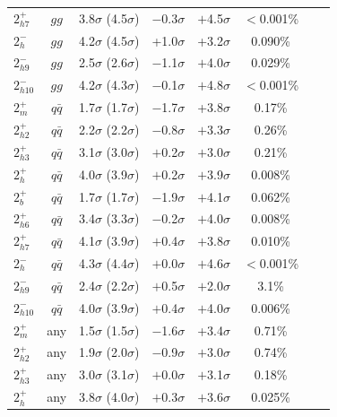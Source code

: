 \begin{table}
{\begin{tabular}{lccccccc}
$2^+_{h7}$ & $gg$         & 3.8$\sigma$ (4.5$\sigma$) & $-$0.3$\sigma$ & $+$4.5$\sigma$ & $<$0.001\%  \\
 $2^-_{h}$     & $gg$       &  4.2$\sigma$ (4.5$\sigma$)  & +1.0$\sigma$    & +3.2$\sigma$  &  0.090\%  \\
$2^-_{h9}$ & $gg$          & 2.5$\sigma$ (2.6$\sigma$) & $-$1.1$\sigma$ & $+$4.0$\sigma$ & 0.029\%  \\
$2^-_{h10}$ & $gg$         & 4.2$\sigma$ (4.3$\sigma$) & $-$0.1$\sigma$ & $+$4.8$\sigma$ & $<$0.001\%  \\
\hline
$2_{m}^+$     & $q\bar{q}$       &  1.7$\sigma$ (1.7$\sigma$)  & $-$1.7$\sigma$  & +3.8$\sigma$  &  0.17\% \\
$2^+_{h2}$ & $q\bar{q}$ & 2.2$\sigma$ (2.2$\sigma$) & $-$0.8$\sigma$ & $+$3.3$\sigma$ & 0.26\% \\
$2^+_{h3}$ & $q\bar{q}$ & 3.1$\sigma$ (3.0$\sigma$) & $+$0.2$\sigma$ & $+$3.0$\sigma$ & 0.21\% \\
$2^+_{h}$  & $q\bar{q}$ & 4.0$\sigma$ (3.9$\sigma$) & $+$0.2$\sigma$ & $+$3.9$\sigma$ & 0.008\%  \\
$2^+_{b}$  & $q\bar{q}$ & 1.7$\sigma$ (1.7$\sigma$) & $-$1.9$\sigma$ & $+$4.1$\sigma$ & 0.062\%  \\
$2^+_{h6}$ & $q\bar{q}$ & 3.4$\sigma$ (3.3$\sigma$) & $-$0.2$\sigma$ & $+$4.0$\sigma$ & 0.008\%  \\
$2^+_{h7}$ & $q\bar{q}$ & 4.1$\sigma$ (3.9$\sigma$) & $+$0.4$\sigma$ & $+$3.8$\sigma$ & 0.010\%  \\
$2^-_{h}$  & $q\bar{q}$  & 4.3$\sigma$ (4.4$\sigma$) & $+$0.0$\sigma$ & $+$4.6$\sigma$ & $<$0.001\% \\
$2^-_{h9}$ & $q\bar{q}$  & 2.4$\sigma$ (2.2$\sigma$) & $+$0.5$\sigma$ & $+$2.0$\sigma$ & 3.1\%  \\
$2^-_{h10}$ & $q\bar{q}$ & 4.0$\sigma$ (3.9$\sigma$) & $+$0.4$\sigma$ & $+$4.0$\sigma$ & 0.006\%  \\
\hline
$2_{m}^+$      & any                   &  1.5$\sigma$ (1.5$\sigma$)  & $-$1.6$\sigma$  & +3.4$\sigma$  &  0.71\% \\
$2^+_{h2}$ & any                                 & 1.9$\sigma$ (2.0$\sigma$) & $-$0.9$\sigma$ & $+$3.0$\sigma$ & 0.74\%  \\
$2^+_{h3}$ & any                                 & 3.0$\sigma$ (3.1$\sigma$) & $+$0.0$\sigma$ & $+$3.1$\sigma$ & 0.18\%  \\
$2^+_{h}$  & any                                 & 3.8$\sigma$ (4.0$\sigma$) & $+$0.3$\sigma$ & $+$3.6$\sigma$ & 0.025\%  \\

\end{tabular}}
\end{table}
